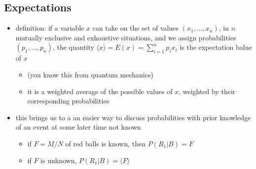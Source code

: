 \documentclass[../jaynes_prob_theory_notes.tex]{subfiles}
\begin{document}
\subsection{Expectations}
    \begin{itemize}
        \item definition: if a variable $x$ can take on the set of values $(x_1, \ldots, x_n)$, in $n$ mutually exclusive and exhaustive situations, and we assign probabilities $(p_1, \ldots, p_n)$, the quantity $\langle x \rangle = E(x) = \sum^n_{i=1}p_ix_i$ is the expectation balue of $x$
            \begin{itemize}
                \item (you know this from quantum mechanics)
                \item it is a weighted average of the possible values of $x$, weighted by their corresponding probabilities
            \end{itemize}
        \item this brings us to a an easier way to discuss probabilities with prior knowledge of an event at some later time not known
            \begin{itemize}
                \item if $F = M/N$ of red balls is known, then $P(R_1|B) = F$
                \item if $F$ is unknown, $P(R_1|B) = \langle F \rangle$
            \end{itemize}
    \end{itemize}
    
\end{document}
